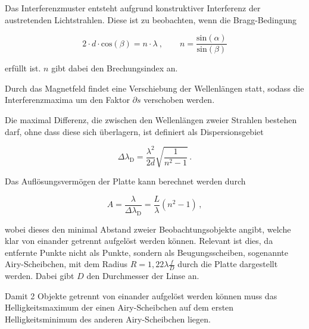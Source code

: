 \noindent
Das Interferenzmuster entsteht aufgrund konstruktiver Interferenz der austretenden Lichtstrahlen. Diese ist zu beobachten, wenn die Bragg-Bedingung 

\vspace{-5pt}
\begin{equation}
    2 \cdot d \cdot \text{cos}(\beta) = n \cdot \lambda \: , 
    \qquad n = \frac{\text{sin}(\alpha)}{\text{sin}(\beta)}
\end{equation}

\noindent
 erfüllt ist. $n$ gibt dabei den Brechungsindex an.

\noindent
Durch das Magnetfeld findet eine Verschiebung der Wellenlängen statt, sodass die Interferenzmaxima um den Faktor $\partial s$ verschoben werden.

Die maximal Differenz, die zwischen den Wellenlängen zweier Strahlen bestehen darf, ohne dass diese sich überlagern, ist definiert als Dispersionsgebiet

\vspace{-20pt}
\begin{equation}
    \Delta \lambda_\text{D} = \frac{\lambda^2}{2d} \sqrt{\frac{1}{n^2-1}}\, .
    \label{eqn:lam}
\end{equation}

Das Auflösungsvermögen der Platte kann berechnet werden durch 

\vspace{-5pt}
\begin{equation}
    A = \frac{\lambda}{\Delta \lambda_\text{D}} = \frac{L}{\lambda} (n^2 -1) \, ,
    \label{eqn:a}
\end{equation}

\noindent
wobei dieses den minimal Abstand zweier Beobachtungsobjekte angibt, welche klar von einander getrennt aufgelöst werden können. Relevant ist dies, da entfernte Punkte nicht als Punkte,
sondern als Beugungsscheiben, sogenannte Airy-Scheibchen, mit dem Radius $ R = 1,22 \lambda \frac{f}{D}$ durch die Platte dargestellt werden. Dabei gibt $D$ den Durchmesser der 
Linse an. 

\noindent
Damit 2 Objekte getrennt von einander aufgelöst werden können muss das Helligkeitsmaximum der einen Airy-Scheibchen auf dem ersten Helligkeitsminimum des anderen Airy-Scheibchen liegen.


